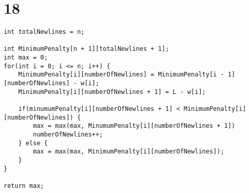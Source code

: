 \documentclass[letterpaper,notitlepage,twoside]{article}
\begin{document}
\section*{18}
\begin{verbatim}
int totalNewlines = n;

int MinimumPenalty[n + 1][totalNewlines + 1];
int max = 0;
for(int i = 0; i <= n; i++) {
    MinimumPenalty[i][numberOfNewlines] = MinimumPenalty[i - 1][numberOfNewlines] - w[i];
    MinimumPenalty[i][numberOfNewlines + 1] = L - w[i];

    if(minumumPenalty[i][numberOfNewlines + 1] < MinimumPenalty[i][numberOfNewlines]) {
        max = max(max, MinumumPenalty[i][numberOfNewlines + 1])
        numberOfNewlines++;
    } else {
        max = max(max, MinimumPenalty[i][numberOfNewlines]);
    }
}

return max;
\end{verbatim}
\end{document}
